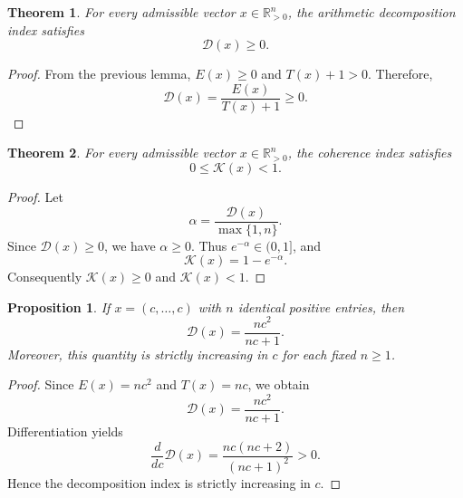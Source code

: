 \documentclass[11pt]{article}
\newtheorem{proposition}{Proposition}
\newtheorem{theorem}{Theorem}
\begin{document}
\begin{theorem}
For every admissible vector $x\in\mathbb{R}_{>0}^n$, the arithmetic decomposition index satisfies
\begin{equation}
\mathcal{D}(x)\ge 0.
\end{equation}
\end{theorem}
\begin{proof}
From the previous lemma, $E(x)\ge 0$ and $T(x)+1>0$. Therefore,
\begin{equation}
\mathcal{D}(x)=\frac{E(x)}{T(x)+1}\ge 0.
\end{equation}
\end{proof}

\begin{theorem}
For every admissible vector $x\in\mathbb{R}_{>0}^n$, the coherence index satisfies
\begin{equation}
0\le \mathcal{K}(x)<1.
\end{equation}
\end{theorem}
\begin{proof}
Let
\begin{equation}
\alpha = \frac{\mathcal{D}(x)}{\max\{1,n\}}.
\end{equation}
Since $\mathcal{D}(x)\ge 0$, we have $\alpha\ge 0$. Thus $e^{-\alpha}\in (0,1]$, and
\begin{equation}
\mathcal{K}(x)=1-e^{-\alpha}.
\end{equation}
Consequently $\mathcal{K}(x)\ge 0$ and $\mathcal{K}(x)<1$.
\end{proof}

\begin{proposition}
If $x=(c,\ldots,c)$ with $n$ identical positive entries, then
\begin{equation}
\mathcal{D}(x)=\frac{n c^2}{n c +1}.
\end{equation}
Moreover, this quantity is strictly increasing in $c$ for each fixed $n\ge 1$.
\end{proposition}
\begin{proof}
Since $E(x)=nc^2$ and $T(x)=nc$, we obtain
\begin{equation}
\mathcal{D}(x)=\frac{nc^2}{nc+1}.
\end{equation}
Differentiation yields
\begin{equation}
\frac{d}{dc}\mathcal{D}(x)=\frac{nc(nc+2)}{(nc+1)^2}>0.
\end{equation}
Hence the decomposition index is strictly increasing in $c$.
\end{proof}
\end{document}

